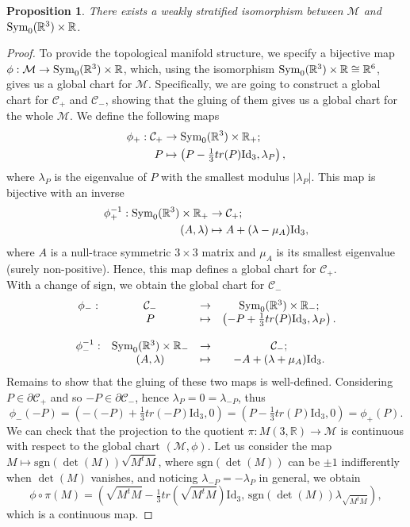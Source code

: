 \documentclass{article}
\numberwithin{equation}{section}
\newtheorem{proposition}{Proposition}[section]
\theoremstyle{definition}
\newcommand{\R}{\mathbb{R}}
\newcommand{\M}{\mathcal{M}}
\begin{document}
\begin{proposition}
    There exists a weakly stratified isomorphism between $\mathcal{M}$ and ${\rm Sym}_0(\R^3)\times \R$.
\end{proposition}
\begin{proof}
     To provide the topological manifold structure, we specify a bijective map $\phi:\M\to{\rm Sym}_0(\R^3)\times \R$, which, using the isomorphism ${\rm Sym}_0(\R^3)\times \R\cong \R^6$, gives us a global chart for $\M$. Specifically, we are going to construct a global chart for $\mathcal{C}_{+}$ and $\mathcal{C}_-$, showing that the gluing of them gives us a global chart for the whole $\mathcal{M}$. We define the following maps
    \begin{align*}
        \phi_+:\mathcal{C}_{+}&\to {\rm Sym}_0(\R^3)\times \R_+;\\
        P&\mapsto \left(P-\tfrac{1}{3}tr(P)\mathrm{Id}_3, \lambda_P\right),
    \end{align*}
    where $\lambda_P$ is the eigenvalue of $P$ with the smallest modulus $|\lambda_P|$. This map is bijective with an inverse
    \begin{align*}
        \phi_+^{-1}:{\rm Sym}_0(\R^3)\times \R_+&\to\mathcal{C}_{+};\\
        (A,\lambda)&\mapsto A+(\lambda-\mu_A)\mathrm{Id}_3,
    \end{align*}
    where $A$ is a null-trace symmetric $3\times 3$ matrix and $\mu_A$ is its smallest eigenvalue (surely non-positive). Hence, this map defines a global chart for $\mathcal{C}_{+}$.\\
    With a change of sign, we obtain the global chart for $\mathcal{C}_{-}$
    \[\begin{matrix}
        \phi_-:&\mathcal{C}_{-}&\to &{\rm Sym}_0(\R^3)\times \R_-;\\
        &P&\mapsto &\left(-P+\tfrac{1}{3}tr(P)\mathrm{Id}_3, \lambda_P\right).\\
        & & & \\
        \phi_-^{-1}:&{\rm Sym}_0(\R^3)\times \R_-&\to&\mathcal{C}_{-};\\
        &(A,\lambda)&\mapsto& -A+(\lambda+\mu_A)\mathrm{Id}_3.
    \end{matrix}\]
    Remains to show that the gluing of these two maps is well-defined. Considering $P\in\partial\mathcal{C}_{+}$ and so $-P\in\partial\mathcal{C}_{-}$, hence $\lambda_P=0=\lambda_{-P}$, thus
    \[\phi_-(-P)=\left(-(-P)+\tfrac{1}{3}tr(-P)\mathrm{Id}_3,0\right)=\left(P-\tfrac{1}{3}tr(P)\mathrm{Id}_3,0\right)=\phi_+(P).\]
    We can check that the projection to the quotient $\pi:M(3,\R)\to\mathcal{M}$ is continuous with respect to the global chart $(\mathcal{M},\phi)$. Let us consider the map $M\mapsto\mathrm{sgn}(\det(M))\sqrt{M^tM}$, where $\mathrm{sgn}(\det(M))$ can be $\pm1$ indifferently when $\det(M)$ vanishes, and noticing $\lambda_{-P}=-\lambda_P$ in general, we obtain
\begin{equation}
    \phi\circ \pi(M)=\left(\sqrt{M^tM}-\tfrac{1}{3}tr(\sqrt{M^tM})\mathrm{Id}_3,\,\mathrm{sgn}(\det(M))\lambda_{\sqrt{M^tM}}\right),
\end{equation}
    which is a continuous map.


\end{proof}
\end{document}
